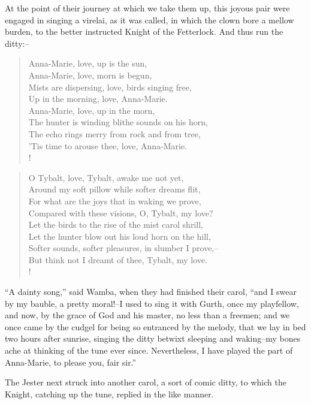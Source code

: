 At the point of their journey at which we take them up, this joyous pair
were engaged in singing a virelai, as it was called, in which the clown
bore a mellow burden, to the better instructed Knight of the Fetterlock.
And thus run the ditty:--

\begin{verse}
Anna-Marie, love, up is the sun,\\
Anna-Marie, love, morn is begun,\\
Mists are dispersing, love, birds singing free,\\
Up in the morning, love, Anna-Marie.\\
Anna-Marie, love, up in the morn,\\
The hunter is winding blithe sounds on his horn,\\
The echo rings merry from rock and from tree,\\
'Tis time to arouse thee, love, Anna-Marie.\\!
\end{verse}

\begin{verse}

O Tybalt, love, Tybalt, awake me not yet,\\
Around my soft pillow while softer dreams flit,\\
For what are the joys that in waking we prove,\\
Compared with these visions, O, Tybalt, my love?\\
Let the birds to the rise of the mist carol shrill,\\
Let the hunter blow out his loud horn on the hill,\\
Softer sounds, softer pleasures, in slumber I prove,--\\
But think not I dreamt of thee, Tybalt, my love.\\!
\end{verse}

``A dainty song,'' said Wamba, when they had finished their carol, ``and
I swear by my bauble, a pretty moral!--I used to sing it with Gurth,
once my playfellow, and now, by the grace of God and his master, no less
than a freemen; and we once came by the cudgel for being so entranced by
the melody, that we lay in bed two hours after sunrise, singing the
ditty betwixt sleeping and waking--my bones ache at thinking of the tune
ever since. Nevertheless, I have played the part of Anna-Marie, to
please you, fair sir.''

The Jester next struck into another carol, a sort of comic ditty, to
which the Knight, catching up the tune, replied in the like manner.

